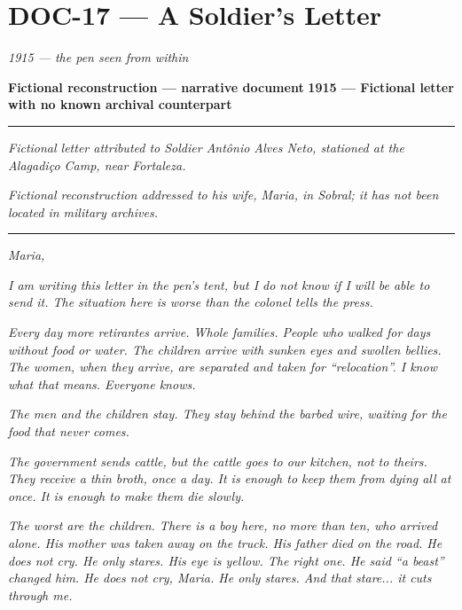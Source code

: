 \section*{\textbf{DOC-17} --- A Soldier's Letter}

\noindent \textit{1915 --- the pen seen from within}

\noindent \textbf{Fictional reconstruction --- narrative document}
\textbf{1915 --- Fictional letter with no known archival counterpart}

\vspace{0.5em}\noindent\rule{\textwidth}{0.5pt}\vspace{0.5em}

\noindent \textit{Fictional letter attributed to Soldier Antônio Alves Neto, stationed at the Alagadiço Camp, near Fortaleza.}

\noindent \textit{Fictional reconstruction addressed to his wife, Maria, in Sobral; it has not been located in military archives.}

\vspace{0.5em}\noindent\rule{\textwidth}{0.5pt}\vspace{0.5em}

\noindent \textit{Maria,}

\noindent \textit{I am writing this letter in the pen's tent, but I do not know if I will be able to send it. The situation here is worse than the colonel tells the press.}

\noindent \textit{Every day more retirantes arrive. Whole families. People who walked for days without food or water. The children arrive with sunken eyes and swollen bellies. The women, when they arrive, are separated and taken for \textquotedblleft{}relocation\textquotedblright{}. I know what that means. Everyone knows.}

\noindent \textit{The men and the children stay. They stay behind the barbed wire, waiting for the food that never comes.}

\noindent \textit{The government sends cattle, but the cattle goes to our kitchen, not to theirs. They receive a thin broth, once a day. It is enough to keep them from dying all at once. It is enough to make them die slowly.}

\noindent \textit{The worst are the children. There is a boy here, no more than ten, who arrived alone. His mother was taken away on the truck. His father died on the road. He does not cry. He only stares. His eye is yellow. The right one. He said \textquotedblleft{}a beast\textquotedblright{} changed him. He does not cry, Maria. He only stares. And that stare... it cuts through me.}

